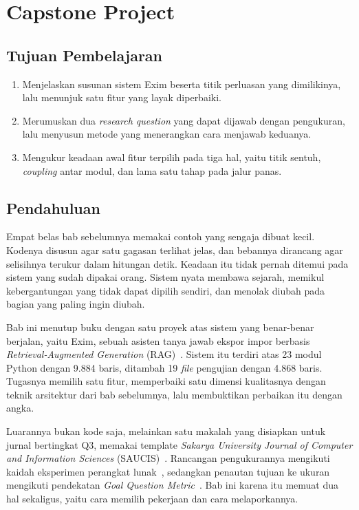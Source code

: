 \chapter{Capstone Project}
\label{bab:capstone}

\section*{Tujuan Pembelajaran}

\begin{enumerate}
  \item Menjelaskan susunan sistem Exim beserta titik perluasan yang dimilikinya,
    lalu menunjuk satu fitur yang layak diperbaiki.
  \item Merumuskan dua \textit{research question} yang dapat dijawab dengan
    pengukuran, lalu menyusun metode yang menerangkan cara menjawab keduanya.
  \item Mengukur keadaan awal fitur terpilih pada tiga hal, yaitu titik sentuh,
    \textit{coupling} antar modul, dan lama satu tahap pada jalur panas.
\end{enumerate}

\section{Pendahuluan}

Empat belas bab sebelumnya memakai contoh yang sengaja dibuat kecil. Kodenya
disusun agar satu gagasan terlihat jelas, dan bebannya dirancang agar
selisihnya terukur dalam hitungan detik. Keadaan itu tidak pernah ditemui pada
sistem yang sudah dipakai orang. Sistem nyata membawa sejarah, memikul
kebergantungan yang tidak dapat dipilih sendiri, dan menolak diubah pada
bagian yang paling ingin diubah.

Bab ini menutup buku dengan satu proyek atas sistem yang benar-benar berjalan,
yaitu Exim, sebuah asisten tanya jawab ekspor impor berbasis
\textit{Retrieval-Augmented Generation} (RAG)~\cite{yohannis2026exim}. Sistem
itu terdiri atas 23 modul Python dengan 9.884 baris, ditambah 19 \textit{file}
pengujian dengan 4.868 baris. Tugasnya memilih satu fitur, memperbaiki satu
dimensi kualitasnya dengan teknik arsitektur dari bab sebelumnya, lalu
membuktikan perbaikan itu dengan angka.

Luarannya bukan kode saja, melainkan satu makalah yang disiapkan untuk jurnal
bertingkat Q3, memakai template \textit{Sakarya University Journal of Computer
and Information Sciences} (SAUCIS)~\cite{saucis2026rules}. Rancangan
pengukurannya mengikuti kaidah eksperimen perangkat
lunak~\cite{wohlin2012experimentation}, sedangkan penautan tujuan ke ukuran
mengikuti pendekatan \textit{Goal Question Metric}~\cite{basili1994gqm}. Bab
ini karena itu memuat dua hal sekaligus, yaitu cara memilih pekerjaan dan cara
melaporkannya.


